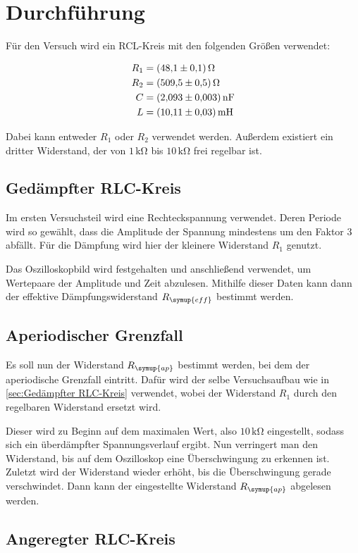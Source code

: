 \section{Durchführung}
\label{sec:Durchführung}

Für den Versuch wird ein RCL-Kreis mit den folgenden Größen verwendet:

\begin{align}
    R_{1} &= \qty{48.1+-0.1}{\ohm} \\ \notag
    R_{2} &= \qty{509.5+-0.5}{\ohm} \\ \notag
    C &= \qty{2.093+-0.003}{\nano\farad} \\ \notag
    L &= \qty{10.11+-0.03}{\milli\henry} \notag
\end{align}

Dabei kann entweder $R_{1}$ oder $R_{2}$ verwendet werden.
Außerdem existiert ein dritter Widerstand, der von $1\,\unit{\kilo\ohm}$ bis $10\,\unit{\kilo\ohm}$ frei regelbar ist.

\subsection{Gedämpfter RLC-Kreis}
\label{sec:Gedämpfter RLC-Kreis}

Im ersten Versuchsteil wird eine Rechteckspannung verwendet. Deren Periode wird so gewählt, dass die Amplitude der Spannung
mindestens um den Faktor 3 abfällt.
Für die Dämpfung wird hier der kleinere Widerstand $R_{1}$ genutzt.

Das Oszilloskopbild wird festgehalten und anschließend verwendet, um Wertepaare der Amplitude und Zeit abzulesen.
Mithilfe dieser Daten kann dann der effektive Dämpfungswiderstand $R_{\symup{eff}}$ bestimmt werden.

\subsection{Aperiodischer Grenzfall}
\label{sec:Aperiodischer Grenzfall Durchführung}

Es soll nun der Widerstand $R_{\symup{ap}}$ bestimmt werden, bei dem der aperiodische Grenzfall eintritt.
Dafür wird der selbe Versuchsaufbau wie in \autoref{sec:Gedämpfter RLC-Kreis} verwendet, wobei der Widerstand $R_{1}$
durch den regelbaren Widerstand ersetzt wird.

Dieser wird zu Beginn auf dem maximalen Wert, also $10\,\unit{\kilo\ohm}$ eingestellt, sodass sich ein überdämpfter Spannungsverlauf ergibt.
Nun verringert man den Widerstand, bis auf dem Oszilloskop eine Überschwingung zu erkennen ist.
Zuletzt wird der Widerstand wieder erhöht, bis die Überschwingung gerade verschwindet.
Dann kann der eingestellte Widerstand $R_{\symup{ap}}$ abgelesen werden.

\subsection{Angeregter RLC-Kreis}
\label{sec:Angeregter RLC-Kreis}